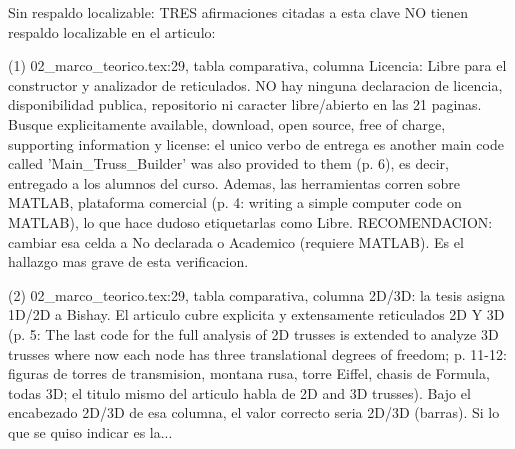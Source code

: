 \documentclass[11pt,a4paper]{article}
\newcommand{\campo}[1]{\textcolor{gris}{\footnotesize #1}}
\begin{document}
{\small\campo{Sin respaldo localizable:} TRES afirmaciones citadas a esta clave NO tienen respaldo localizable en el articulo:

(1) 02\_marco\_teorico.tex:29, tabla comparativa, columna \textquotedbl{}Licencia: Libre\textquotedbl{} para el constructor y analizador de reticulados. NO hay ninguna declaracion de licencia, disponibilidad publica, repositorio ni caracter libre/abierto en las 21 paginas. Busque explicitamente \textquotedbl{}available\textquotedbl{}, \textquotedbl{}download\textquotedbl{}, \textquotedbl{}open source\textquotedbl{}, \textquotedbl{}free of charge\textquotedbl{}, \textquotedbl{}supporting information\textquotedbl{} y \textquotedbl{}license\textquotedbl{}: el unico verbo de entrega es \textquotedbl{}another main code called 'Main\_Truss\_Builder' was also provided to them\textquotedbl{} (p. 6), es decir, entregado a los alumnos del curso. Ademas, las herramientas corren sobre MATLAB, plataforma comercial (p. 4: \textquotedbl{}writing a simple computer code on MATLAB\textquotedbl{}), lo que hace dudoso etiquetarlas como \textquotedbl{}Libre\textquotedbl{}. RECOMENDACION: cambiar esa celda a \textquotedbl{}No declarada\textquotedbl{} o \textquotedbl{}Academico (requiere MATLAB)\textquotedbl{}. Es el hallazgo mas grave de esta verificacion.

(2) 02\_marco\_teorico.tex:29, tabla comparativa, columna \textquotedbl{}2D/3D\textquotedbl{}: la tesis asigna \textquotedbl{}1D/2D\textquotedbl{} a Bishay. El articulo cubre explicita y extensamente reticulados 2D Y 3D (p. 5: \textquotedbl{}The last code for the full analysis of 2D trusses is extended to analyze 3D trusses where now each node has three translational degrees of freedom\textquotedbl{}; p. 11-12: figuras de torres de transmision, montana rusa, torre Eiffel, chasis de Formula, todas 3D; el titulo mismo del articulo habla de \textquotedbl{}2D and 3D trusses\textquotedbl{}). Bajo el encabezado \textquotedbl{}2D/3D\textquotedbl{} de esa columna, el valor correcto seria \textquotedbl{}2D/3D (barras)\textquotedbl{}. Si lo que se quiso indicar es la...\par}
\end{document}
